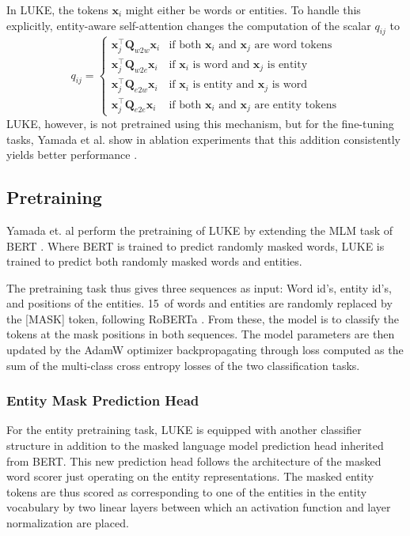 \documentclass[main.tex]{subfiles}
\begin{document}
In LUKE, the tokens $\mathbf x_i$ might either be words or entities.
To handle this explicitly, entity-aware self-attention changes the computation of the scalar $q_{ij}$ to
\begin{equation}
    q_{ij} = 
    \begin{cases}
    \mathbf x_j^\top \mathbf Q_{w2w} \mathbf x_i  & \text{if both $\mathbf x_i$ and $\mathbf x_j$ are word tokens}\\
    \mathbf x_j^\top \mathbf Q_{w2e} \mathbf x_i & \text{if $\mathbf x_i$ is word and $\mathbf x_j$ is entity}\\
    \mathbf x_j^\top \mathbf Q_{e2w} \mathbf x_i & \text{if $\mathbf x_i$ is entity and $\mathbf x_j$ is word}\\
    \mathbf x_j^\top \mathbf Q_{e2e} \mathbf x_i & \text{if both $\mathbf x_i$ and $\mathbf x_j$ are entity tokens}
    \end{cases}
\end{equation}
LUKE, however, is not pretrained using this mechanism, but for the fine-tuning tasks, Yamada et al. show in ablation experiments that this addition consistently yields better performance \cite[Sec. 5.2]{yamada2020luke}.

\subsection{Pretraining}
Yamada et. al perform the pretraining of LUKE by extending the MLM task of BERT \cite{devlin2019bert}.
Where BERT is trained to predict randomly masked words, LUKE is trained to predict both randomly masked words and entities.

The pretraining task thus gives three sequences as input:
Word id's, entity id's, and positions of the entities.
15\pro\ of words and entities are randomly replaced by the [MASK] token, following RoBERTa \cite{liu2019roberta}.
From these, the model is to classify the tokens at the mask positions in both sequences.
The model parameters are then updated by the AdamW optimizer backpropagating through loss computed as the sum of the multi-class cross entropy losses of the two classification tasks.

\subsubsection{Entity Mask Prediction Head}
For the entity pretraining task, LUKE is equipped with another classifier structure in addition to the masked language model prediction head inherited from BERT.
This new prediction head follows the architecture of the masked word scorer just operating on the entity representations.
The masked entity tokens are thus scored as corresponding to one of the entities in the entity vocabulary by two linear layers between which an activation function and layer normalization are placed.
\end{document}
